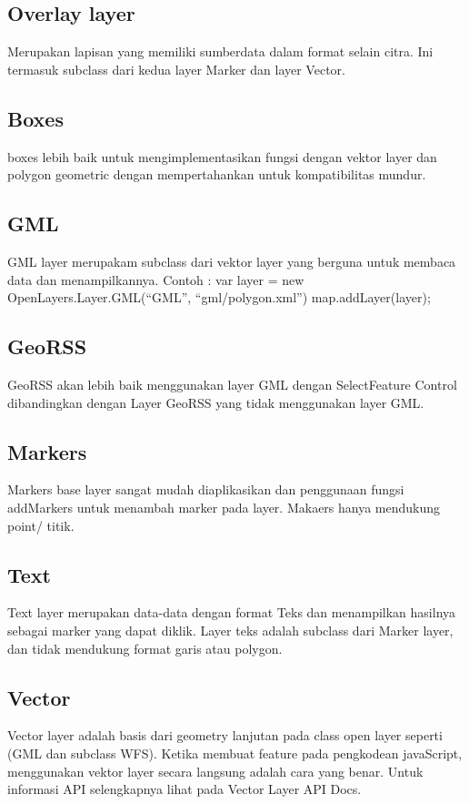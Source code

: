 \subsection {Overlay layer}
Merupakan lapisan yang memiliki sumberdata dalam format selain citra. Ini termasuk subclass dari kedua layer Marker dan layer Vector.

\subsection {Boxes}
boxes lebih baik untuk mengimplementasikan fungsi dengan vektor layer dan polygon geometric dengan mempertahankan untuk kompatibilitas mundur.

\subsection {GML}
GML layer merupakam subclass dari vektor layer yang berguna untuk membaca data dan menampilkannya. 
Contoh :
var layer = new OpenLayers.Layer.GML(“GML”, “gml/polygon.xml”)
map.addLayer(layer);

\subsection {GeoRSS}
GeoRSS akan  lebih baik menggunakan layer GML dengan SelectFeature Control dibandingkan dengan Layer GeoRSS yang tidak menggunakan layer GML.

\subsection {Markers}
Markers base layer sangat mudah diaplikasikan dan penggunaan fungsi addMarkers untuk menambah marker pada layer. Makaers hanya mendukung point/ titik.

\subsection {Text}
Text layer merupakan data-data dengan format Teks dan menampilkan hasilnya sebagai marker yang dapat diklik. Layer teks adalah subclass dari Marker layer, dan tidak mendukung format garis atau polygon.

\subsection {Vector}
Vector layer adalah basis dari geometry lanjutan pada class open layer seperti (GML dan subclass WFS). Ketika membuat feature pada pengkodean javaScript, menggunakan vektor layer secara langsung adalah cara yang benar.
Untuk informasi API selengkapnya lihat pada Vector Layer API Docs.
